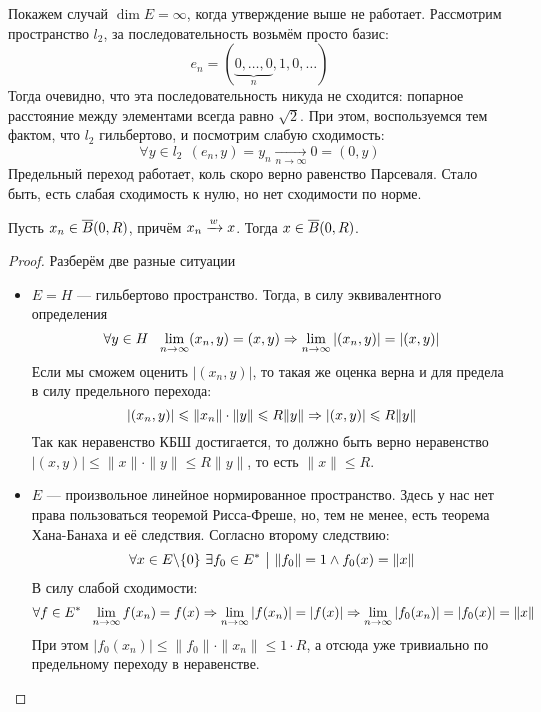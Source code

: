 \begin{example}
	Покажем случай $\dim E = \infty$, когда утверждение выше не работает. Рассмотрим пространство $l_2$, за последовательность возьмём просто базис:
	\[
		e_n = (\underbrace{0, \ldots, 0}_{n}, 1, 0, \ldots)
	\]
	Тогда очевидно, что эта последовательность никуда не сходится: попарное расстояние между элементами всегда равно $\sqrt{2}$. При этом, воспользуемся тем фактом, что $l_2$ гильбертово, и посмотрим слабую сходимость:
	\[
		\forall y \in l_2\ \ (e_n, y) = y_n \xrightarrow[n \to \infty]{} 0 = (0, y)
	\]
	Предельный переход работает, коль скоро верно равенство Парсеваля. Стало быть, есть слабая сходимость к нулю, но нет сходимости по норме.
\end{example}

\begin{task}
	Пусть $x_n \in \overline{B}(0, R)$, причём $x_n \xrightarrow{w} x$. Тогда $x \in \overline{B}(0, R)$.
\end{task}

\begin{proof}
	Разберём две разные ситуации
	\begin{itemize}
		\item $E = H$ --- гильбертово пространство. Тогда, в силу эквивалентного определения
		\[
			\forall y \in H\ \ \lim_{n \to \infty} (x_n, y) = (x, y) \Rightarrow \lim_{n \to \infty} |(x_n, y)| = |(x, y)|
		\]
		Если мы сможем оценить $|(x_n, y)|$, то такая же оценка верна и для предела в силу предельного перехода:
		\[
			|(x_n, y)| \leqslant \|x_n\| \cdot \|y\| \leqslant R\|y\| \Rightarrow |(x, y)| \leqslant R\|y\|
		\]
		Так как неравенство КБШ достигается, то должно быть верно неравенство $|(x, y)| \le \|x\| \cdot \|y\| \le R\|y\|$, то есть $\|x\| \le R$.
		
		\item $E$ --- произвольное линейное нормированное пространство. Здесь у нас нет права пользоваться теоремой Рисса-Фреше, но, тем не менее, есть теорема Хана-Банаха и её следствия. Согласно второму следствию:
		\[
			\forall x \in E \backslash \{0\}\ \exists f_0 \in E^* \ \big|\  \|f_0\| = 1 \wedge f_0(x) = \|x\|
		\]
		В силу слабой сходимости:
		\[
			\forall f \in E^*\ \ \lim_{n \to \infty} f(x_n) = f(x) \Rightarrow \lim_{n \to \infty} |f(x_n)| = |f(x)| \Rightarrow \lim_{n \to \infty} |f_0(x_n)| = |f_0(x)| = \|x\|
		\]
		При этом $|f_0(x_n)| \le \|f_0\| \cdot \|x_n\| \le 1 \cdot R$, а отсюда уже тривиально по предельному переходу в неравенстве.
	\end{itemize}
\end{proof}

